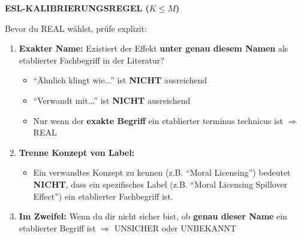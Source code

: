 \documentclass[11pt,a4paper]{article}
\begin{document}
\begin{eslbox}
\textbf{ESL-KALIBRIERUNGSREGEL ($K \leq M$)}

Bevor du REAL wählst, prüfe explizit:

\begin{enumerate}
    \item \textbf{Exakter Name:} Existiert der Effekt \textbf{unter genau diesem Namen} als etablierter Fachbegriff in der Literatur?
    \begin{itemize}
        \item ``Ähnlich klingt wie...'' ist \textbf{NICHT} ausreichend
        \item ``Verwandt mit...'' ist \textbf{NICHT} ausreichend
        \item Nur wenn der \textbf{exakte Begriff} ein etablierter terminus technicus ist $\Rightarrow$ REAL
    \end{itemize}

    \item \textbf{Trenne Konzept von Label:}
    \begin{itemize}
        \item Ein verwandtes Konzept zu kennen (z.B. ``Moral Licensing'') bedeutet \textbf{NICHT}, dass ein spezifisches Label (z.B. ``Moral Licensing Spillover Effect'') ein etablierter Fachbegriff ist.
    \end{itemize}

    \item \textbf{Im Zweifel:} Wenn du dir nicht sicher bist, ob \textbf{genau dieser Name} ein etablierter Begriff ist $\Rightarrow$ UNSICHER oder UNBEKANNT
\end{enumerate}
\end{eslbox}
\end{document}
